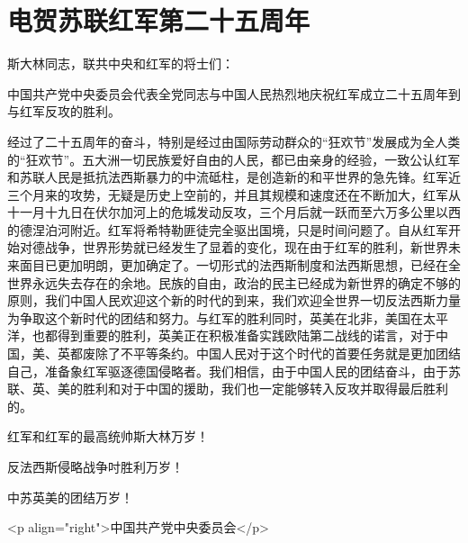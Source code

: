 \section[电贺苏联红军第二十五周年（一九四三年二月二十二日）]{电贺苏联红军第二十五周年}


斯大林同志，联共中央和红军的将士们：

中国共产党中央委员会代表全党同志与中国人民热烈地庆祝红军成立二十五周年到与红军反攻的胜利。

经过了二十五周年的奋斗，特别是经过由国际劳动群众的“狂欢节”发展成为全人类的“狂欢节”。五大洲一切民族爱好自由的人民，都已由亲身的经验，一致公认红军和苏联人民是抵抗法西斯暴力的中流砥柱，是创造新的和平世界的急先锋。红军近三个月来的攻势，无疑是历史上空前的，并且其规模和速度还在不断加大，红军从十一月十九日在伏尔加河上的危城发动反攻，三个月后就一跃而至六万多公里以西的德涅泊河附近。红军将希特勒匪徒完全驱出国境，只是时间问题了。自从红军开始对德战争，世界形势就已经发生了显着的变化，现在由于红军的胜利，新世界未来面目已更加明朗，更加确定了。一切形式的法西斯制度和法西斯思想，已经在全世界永远失去存在的余地。民族的自由，政治的民主已经成为新世界的确定不够的原则，我们中国人民欢迎这个新的时代的到来，我们欢迎全世界一切反法西斯力量为争取这个新时代的团结和努力。与红军的胜利同时，英美在北非，美国在太平洋，也都得到重要的胜利，英美正在积极准备实践欧陆第二战线的诺言，对于中国，美、英都废除了不平等条约。中国人民对于这个时代的首要任务就是更加团结自己，准备象红军驱逐德国侵略者。我们相信，由于中国人民的团结奋斗，由于苏联、英、美的胜利和对于中国的援助，我们也一定能够转入反攻并取得最后胜利的。

红军和红军的最高统帅斯大林万岁！

反法西斯侵略战争吋胜利万岁！

中苏英美的团结万岁！

<p align="right">中国共产党中央委员会</p>

